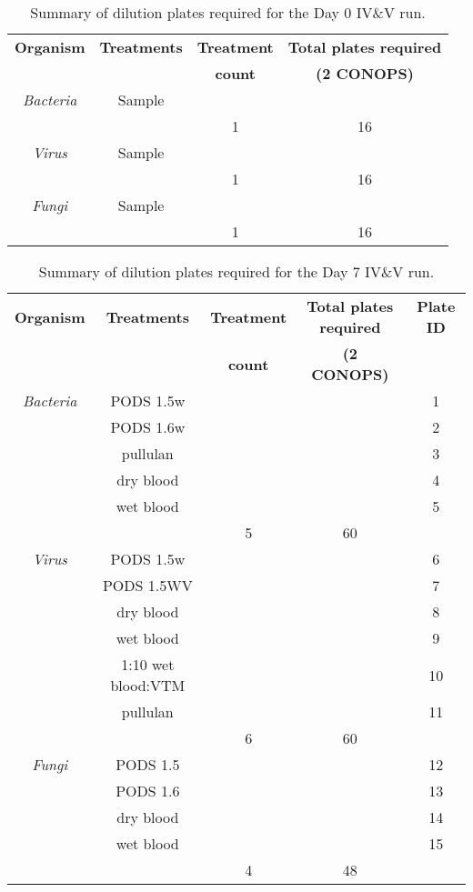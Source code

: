 \documentclass{article}
\begin{document}
\begin{table} 
  \centering
  \begin{tabular}[]{c|c|c|c}
    \textbf{Organism} & \textbf{Treatments} & \textbf{Treatment} & \textbf{Total plates required} \\
     &  & \textbf{count} & \textbf{(2 CONOPS)} \\
    \hline
    \textit{Bacteria} & Sample  & & \\
    \hline
    & & 1 & 16\\
    \hline
    \textit{Virus} & Sample  & & \\
    \hline
    & & 1 & 16\\
    \hline
    \textit{Fungi} & Sample  & & \\
    \hline
    & & 1 & 16\\
    \hline

  \end{tabular}
  \caption{Summary of dilution plates required for the Day 0 IV\&V run.}
  \label{tab:dilution-plan-day-0}
\end{table}


\begin{table}
  \centering
  \begin{tabular}[]{c|c|c|c|c}
    \textbf{Organism} & \textbf{Treatments}  & \textbf{Treatment} & \textbf{Total plates required} & \textbf{Plate ID}\\
     &   & \textbf{count} & \textbf{(2 CONOPS)} & \\
    \hline
    \textit{Bacteria} & PODS 1.5w   & & & 1\\
     & PODS 1.6w   & & & 2\\
     & pullulan & & & 3\\
     & dry blood   & & & 4\\
     & wet blood   & & & 5\\
    \hline
    &  & 5& 60& \\
    \hline
    \textit{Virus} & PODS 1.5w & & & 6\\
     & PODS 1.5WV & & & 7\\
     & dry blood   & & & 8\\
     & wet blood   & & & 9\\
             & 1:10 wet blood:VTM   & & & 10\\
 & pullulan & & & 11\\
    \hline
    &  & 6& 60 & \\
    \hline
    \textit{Fungi} & PODS 1.5 & & & 12\\
     & PODS 1.6 & & & 13\\
     & dry blood   & & & 14\\
     & wet blood   & & & 15\\
    \hline
    &  & 4 & 48 & \\
    \hline

  \end{tabular}
  \caption{Summary of dilution plates required for the Day 7 IV\&V run.}
  \label{tab:dilution-plan-day-7}
\end{table}
\end{document}
